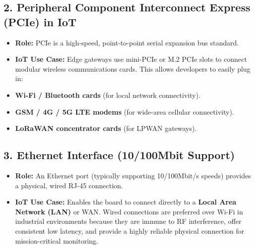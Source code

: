 \subsection{2. Peripheral Component Interconnect Express (PCIe) in IoT}
\begin{itemize}
  \item   \textbf{Role:} PCIe is a high-speed, point-to-point serial expansion bus standard.
  \item   \textbf{IoT Use Case:} Edge gateways use mini-PCIe or M.2 PCIe slots to connect modular wireless communications cards. This allows developers to easily plug in:
  \item   \textbf{Wi-Fi / Bluetooth cards} (for local network connectivity).
  \item   \textbf{GSM / 4G / 5G LTE modems} (for wide-area cellular connectivity).
  \item   \textbf{LoRaWAN concentrator cards} (for LPWAN gateways).
\end{itemize}

\subsection{3. Ethernet Interface (10/100Mbit Support)}
\begin{itemize}
  \item   \textbf{Role:} An Ethernet port (typically supporting 10/100Mbit/s speeds) provides a physical, wired RJ-45 connection.
  \item   \textbf{IoT Use Case:} Enables the board to connect directly to a \textbf{Local Area Network (LAN)} or WAN. Wired connections are preferred over Wi-Fi in industrial environments because they are immune to RF interference, offer consistent low latency, and provide a highly reliable physical connection for mission-critical monitoring.
\end{itemize}

